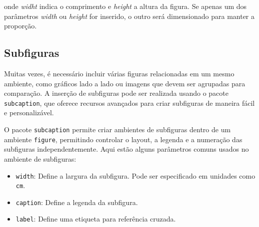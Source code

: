 \noindent onde \textit{widht} indica o comprimento e \textit{height} a altura da figura. Se apenas um dos par\^ametros \textit{width} ou \textit{height} for inserido, o outro ser\'a dimensionado para manter a propor\c c\~ao. 

\subsection{Subfiguras}
Muitas vezes, é necessário incluir várias figuras relacionadas em um mesmo ambiente, como gráficos lado a lado ou imagens que devem ser agrupadas para comparação. A inserção de subfiguras pode ser realizada usando o pacote \texttt{subcaption}, que oferece recursos avançados para criar subfiguras de maneira fácil e personalizável. 

\noindent O pacote \texttt{subcaption} permite criar ambientes de subfiguras dentro de um ambiente \texttt{figure}, permitindo controlar o layout, a legenda e a numeração das subfiguras independentemente. Aqui estão alguns parâmetros comuns usados no ambiente de subfiguras:

\begin{itemize}
    \item \texttt{width}: Define a largura da subfigura. Pode ser especificado em unidades como \verb|cm|.
    \item \texttt{caption}: Define a legenda da subfigura.
    \item \texttt{label}: Define uma etiqueta para referência cruzada.
\end{itemize}


